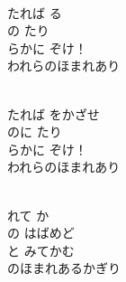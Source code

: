 \documentclass[10pt,b5j]{tarticle} %
\begin{document}
\vspace{1.5em} %
\newcommand{\linespace}{0.5em} %
\newcommand{\blocksize}{0.5\hsize} %
\newcommand{\itemmargin}{3em} %
\begin{enumerate} %
    \setlength{\itemindent}{\itemmargin} %
    \begin{minipage}[c]{\blocksize}
    
        \vspace{\linespace}
        \item~\\
        たれば る\\
        の たり\\
        らかに ぞけ！\\
        われらのほまれあり
        
    \end{minipage}
    \begin{minipage}[c]{\blocksize}
        
        \vspace{\linespace}
        \item~\\
        たれば をかざせ\\
        のに たり\\
        らかに ぞけ！\\
        われらのほまれあり
        
    \end{minipage}
    \begin{minipage}[c]{\blocksize}
        
        \vspace{\linespace}
        \item~\\
        れて か\\
        の はばめど\\
        と みてかむ\\
        のほまれあるかぎり
        

\end{minipage}
\end{enumerate}
\end{document}
